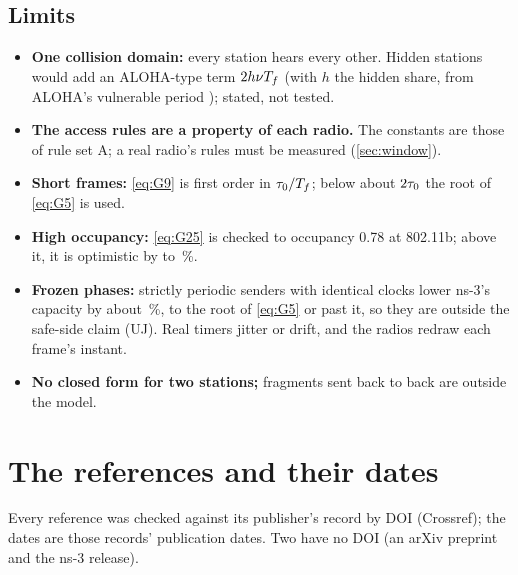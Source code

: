 \documentclass[11pt,a4paper]{article}
\begin{document}
\subsection{Limits}

\begin{itemize}
\item \textbf{One collision domain:} every station hears every other. Hidden stations would add an
ALOHA-type term $2h\nu T_f$ (with $h$ the hidden share, from ALOHA's vulnerable period
\cite{abramson1970aloha}); stated, not tested.
\item \textbf{The access rules are a property of each radio.} The constants are those of rule set
A; a real radio's rules must be measured (\cref{sec:window}).
\item \textbf{Short frames:} \eqref{eq:G9} is first order in $\tau_0/T_f$; below about $2\tau_0$
the root of \eqref{eq:G5} is used.
\item \textbf{High occupancy:} \eqref{eq:G25} is checked to occupancy 0.78 at 802.11b; above it, it
is optimistic by \uhMin{} to \uhMax\,\%.
\item \textbf{Frozen phases:} strictly periodic senders with identical clocks lower ns-3's capacity
by about \ujFzDrop\,\%, to the root of \eqref{eq:G5} or past it, so they are outside the safe-side
claim (UJ). Real timers jitter or drift, and the radios redraw each frame's instant.
\item \textbf{No closed form for two stations;} fragments sent back to back are outside the model.
\end{itemize}

\section{The references and their dates}\label{sec:refs}

Every reference was checked against its publisher's record by DOI (Crossref); the dates are those
records' publication dates. Two have no DOI (an arXiv preprint and the ns-3 release).
\end{document}
